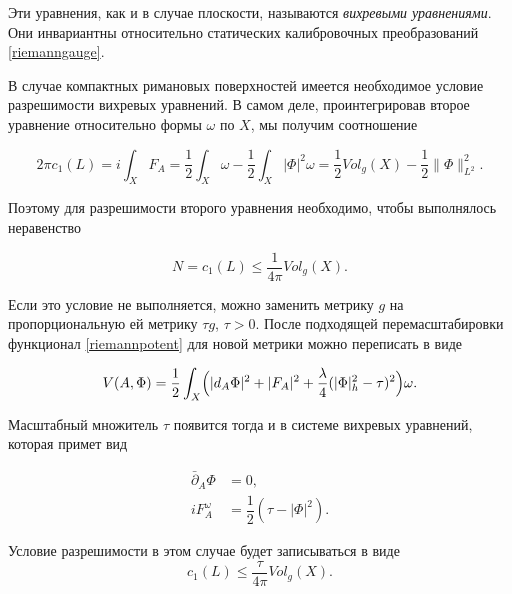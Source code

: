 Эти уравнения, как и в случае плоскости, называются \textit{вихревыми уравнениями}. Они инвариантны относительно статических калибровочных преобразований \eqref{riemanngauge}. 


В случае компактных римановых поверхностей имеется необходимое условие разрешимости вихревых уравнений. В самом деле, проинтегрировав второе уравнение относительно формы $\omega$ по $X$, мы получим соотношение

$$

2\pi c_1(L)=i\int _X F_A=\dfrac12\int _X\omega-\dfrac12\int _X|\Phi|^2\omega=\dfrac12Vol_g(X)-\dfrac12

\|\Phi\|^2_{L^2}.

$$

Поэтому для разрешимости второго уравнения необходимо, чтобы выполнялось неравенство 

$$N=c_1(L)\leqslant\dfrac 1 {4\pi}Vol_g(X).$$

Если это условие не выполняется, можно заменить метрику $g$ на пропорциональную ей метрику $\tau g$, $\tau>0$. После подходящей перемасштабировки функционал \eqref{riemannpotent} для новой метрики можно переписать в виде 

\begin{equation}

\label{riemannpotenttau}

V(A,\Phi)=\dfrac12\int _{X}\Bigl(|d_A\Phi|^2+|F_A|^2+

\frac{\lambda}4(|\Phi|_h^2-\tau)^2\Bigr) \omega. 

\end{equation}

Масштабный множитель $\tau$ появится тогда и в системе вихревых уравнений, которая примет вид

\begin{equation}

\label{riemannvortexeqtau}

\begin{aligned}

\bar\partial_A\Phi&=0,\\

iF_A^\omega&=\dfrac12(\tau-|\Phi|^2).

\end{aligned}

\end{equation}

Условие разрешимости в этом случае будет записываться в виде $$c_1(L)\leqslant\dfrac \tau {4\pi}Vol_g(X).$$ 



